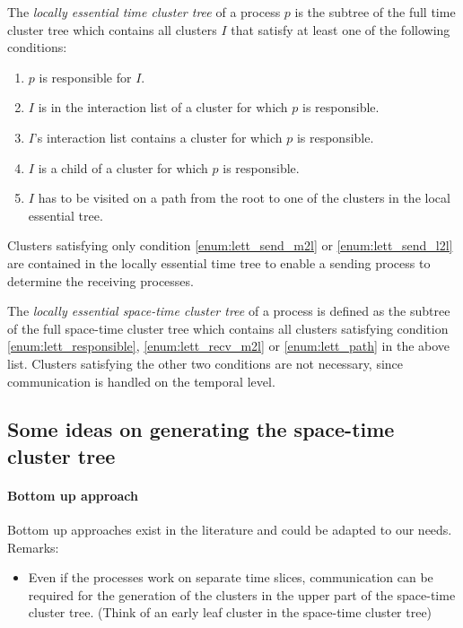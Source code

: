 \documentclass[a4paper,11pt]{article}
\theoremstyle{plain}
\theoremstyle{definition}
\theoremstyle{remark}
\begin{document}
The \textit{locally essential time cluster tree} of a process $p$ is the subtree of the full time cluster tree which contains all clusters $I$ that satisfy at least one of the following conditions:
\begin{enumerate}
  \item $p$ is responsible for $I$. \label{enum:lett_responsible}
  \item $I$ is in the interaction list of a cluster for which $p$ is responsible. \label{enum:lett_recv_m2l}
  \item $I$'s interaction list contains a cluster for which $p$ is responsible. \label{enum:lett_send_m2l}
  \item $I$ is a child of a cluster for which $p$ is responsible. \label{enum:lett_send_l2l}
  \item $I$ has to be visited on a path from the root to one of the clusters in the local essential tree. 
  \label{enum:lett_path}
\end{enumerate}
Clusters satisfying only condition \ref{enum:lett_send_m2l} or \ref{enum:lett_send_l2l} are contained in the locally essential time tree to enable a sending process to determine the receiving processes.

The \textit{locally essential space-time cluster tree} of a process is defined as the subtree of the full space-time cluster tree which contains all clusters satisfying condition \ref{enum:lett_responsible}, \ref{enum:lett_recv_m2l} or \ref{enum:lett_path} in the above list. Clusters satisfying the other two conditions are not necessary, since communication is handled on the temporal level.

\subsection{Some ideas on generating the space-time cluster tree} \label{sec:generation_spacetime_ct}

\paragraph{Bottom up approach}
Bottom up approaches exist in the literature and could be adapted to our needs. Remarks:
\begin{itemize}
  \item Even if the processes work on separate time slices, communication can be required for the generation of the clusters in the upper part of the space-time cluster tree. (Think of an early leaf cluster in the space-time cluster tree)
\end{itemize}
\end{document}
